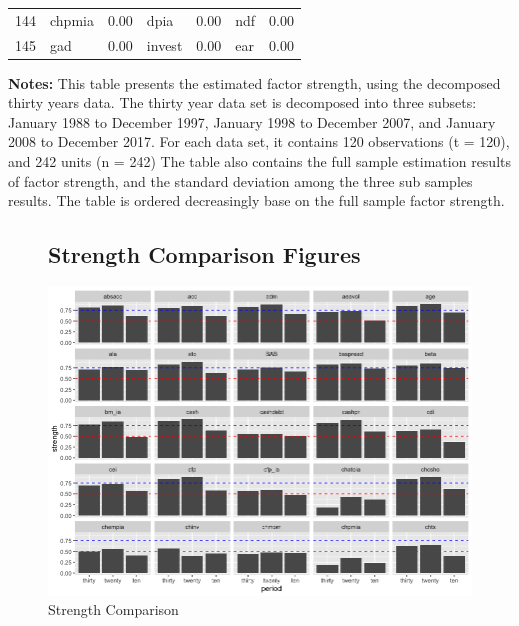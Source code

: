\begin{footnotesize}
\begin{longtable}{rlc|lc|lc}
		144                       & chpmia                      & 0.00                          & dpia                        & 0.00                          & ndf                               & 0.00           \\
		145                       & gad                         & 0.00                          & invest                      & 0.00                          & ear                               & 0.00           \\ \hline




\end{longtable}
			\begin{minipage}{\textwidth}
	{\footnotesize {\bf Notes:}	This table presents the estimated factor strength, using the decomposed thirty years data.
	The thirty year data set is decomposed into three subsets: January 1988 to December 1997, January 1998 to December 2007, and January 2008 to December 2017. For each data set, it contains 120 observations (t = 120), and 242 units (n = 242)
The table also contains the full sample estimation results of factor strength, and the standard deviation among the three sub samples results.
The table is ordered decreasingly base on the full sample factor strength.}
\end{minipage}
\end{footnotesize}



\begin{landscape}
\begin{figure}[ht]
\subsection{Strength Comparison Figures}\label{strength_figures}
			\centering
			\caption{Strength Comparison}\label{figure:strength_compare}
				\includegraphics[scale = 0.75]{strength_comparison_I}
\end{figure}
\end{landscape}



